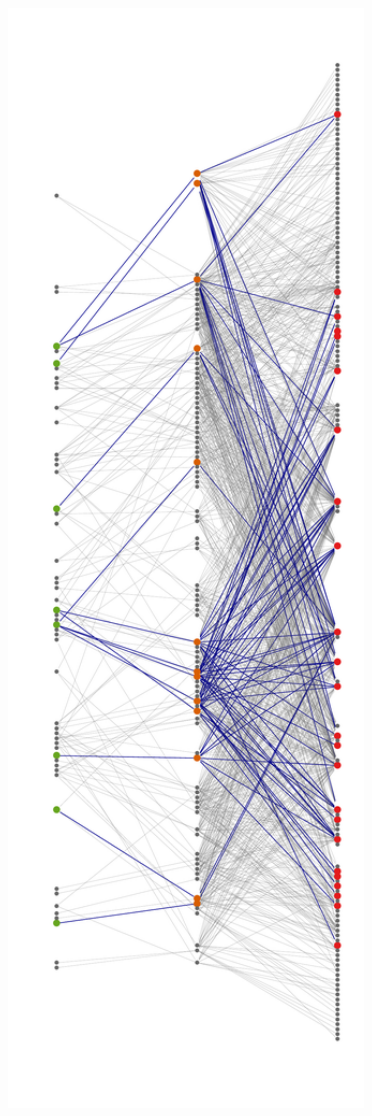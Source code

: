 \documentclass[12pt]{article}
\begin{document}
\begin{figure}[ht!]
\centering\includegraphics[width=1\textwidth]{figures/mw_sampling}
\end{figure}
\end{document}
